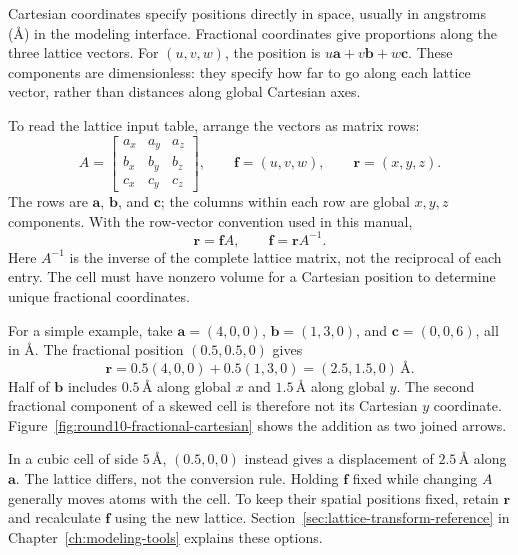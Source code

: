 Cartesian coordinates specify positions directly in space, usually in angstroms (\AA) in the modeling interface. Fractional coordinates give proportions along the three lattice vectors. For $(u,v,w)$, the position is $u\mathbf a+v\mathbf b+w\mathbf c$. These components are dimensionless: they specify how far to go along each lattice vector, rather than distances along global Cartesian axes.

To read the lattice input table, arrange the vectors as matrix rows:
\[
 A=\begin{bmatrix}
 a_x&a_y&a_z\\
 b_x&b_y&b_z\\
 c_x&c_y&c_z
 \end{bmatrix},\qquad
 \mathbf f=(u,v,w),\qquad \mathbf r=(x,y,z).
\]
The rows are $\mathbf a$, $\mathbf b$, and $\mathbf c$; the columns within each row are global $x,y,z$ components. With the row-vector convention used in this manual,
\begin{equation}
 \mathbf r=\mathbf f A,\qquad \mathbf f=\mathbf r A^{-1}.
 \label{eq:row-lattice-coordinates}
\end{equation}
Here $A^{-1}$ is the inverse of the complete lattice matrix, not the reciprocal of each entry. The cell must have nonzero volume for a Cartesian position to determine unique fractional coordinates.

For a simple example, take $\mathbf a=(4,0,0)$, $\mathbf b=(1,3,0)$, and $\mathbf c=(0,0,6)$, all in \AA. The fractional position $(0.5,0.5,0)$ gives
\[
 \mathbf r=0.5(4,0,0)+0.5(1,3,0)
          =(2.5,1.5,0)\,\text{\AA}.
\]
Half of $\mathbf b$ includes $0.5\,\text{\AA}$ along global $x$ and $1.5\,\text{\AA}$ along global $y$. The second fractional component of a skewed cell is therefore not its Cartesian $y$ coordinate. Figure~\ref{fig:round10-fractional-cartesian} shows the addition as two joined arrows.



In a cubic cell of side $5\,\text{\AA}$, $(0.5,0,0)$ instead gives a displacement of $2.5\,\text{\AA}$ along $\mathbf a$. The lattice differs, not the conversion rule. Holding $\mathbf f$ fixed while changing $A$ generally moves atoms with the cell. To keep their spatial positions fixed, retain $\mathbf r$ and recalculate $\mathbf f$ using the new lattice. Section~\ref{sec:lattice-transform-reference} in Chapter~\ref{ch:modeling-tools} explains these options.

